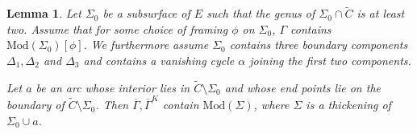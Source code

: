 \documentclass{article}
\newcommand{\Mod}{\textrm{Mod}}
\newtheorem{lemma}{Lemma}[theorem]
\begin{document}
\begin{lemma}\label{extarc}
Let $\Sigma_0$ be a subsurface of $E$ such that the genus of $\Sigma_0 \cap \tilde C$ is at least two. Assume that for some choice of framing $\phi$ on $\Sigma_0$,  $\Gamma$ contains $\Mod(\Sigma_0)[\phi].$ We furthermore assume $\Sigma_0$ contains three boundary components $\Delta_1, \Delta_2$ and $\Delta_3$ and contains a vanishing cycle $\alpha$ joining the first two components.

Let $a$ be an arc whose interior lies in $\tilde C \setminus \Sigma_0$ and whose end points lie on the boundary of $\tilde C \setminus \Sigma_0$. Then $\overline \Gamma, \overline{\Gamma}^K$ contain $\Mod(\Sigma)$, where $\Sigma$ is a thickening of $\Sigma_0 \cup a$. 
\end{lemma}
\end{document}
